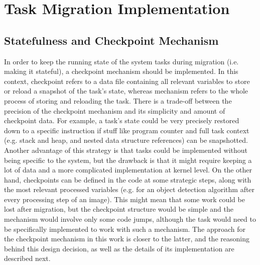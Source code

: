 
\chapter{Task Migration Implementation}\label{chap:migration}

\section{Statefulness and Checkpoint Mechanism}
In order to keep the running state of the system tasks during migration (i.e. making it stateful), a checkpoint mechanism should be implemented. In this context, checkpoint refers to a data file containing all relevant variables to store or reload a snapshot of the task's state, whereas mechanism refers to the whole process of storing and reloading the task. There is a trade-off between the precision of the checkpoint mechanism and its simplicity and amount of checkpoint data. For example, a task's state could be very precisely restored down to a specific instruction if stuff like program counter and full task context (e.g. stack and heap, and nested data structure references) can be snapshotted. Another advantage of this strategy is that tasks could be implemented without being specific to the system, but the drawback is that it might require keeping a lot of data and a more complicated implementation at kernel level. On the other hand, checkpoints can be defined in the code at some strategic steps, along with the most relevant processed variables (e.g. for an object detection algorithm after every processing step of an image). This might mean that some work could be lost after migration, but the checkpoint structure would be simple and the mechanism would involve only some code jumps, although the task would need to be specifically implemented to work with such a mechanism. The approach for the checkpoint mechanism in this work is closer to the latter, and the reasoning behind this design decision, as well as the details of its implementation are described next.

